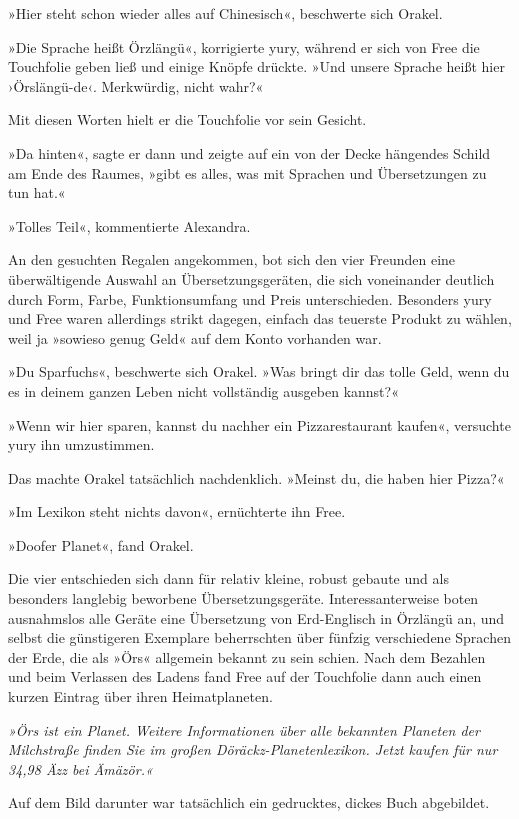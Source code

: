 »Hier steht schon wieder alles auf Chinesisch«, beschwerte sich Orakel.

»Die Sprache heißt Örzlängü«, korrigierte yury, während er sich von Free die Touchfolie geben ließ und einige Knöpfe drückte. »Und unsere Sprache heißt hier ›Örslängü-de‹. Merkwürdig, nicht wahr?«

Mit diesen Worten hielt er die Touchfolie vor sein Gesicht.

»Da hinten«, sagte er dann und zeigte auf ein von der Decke hängendes Schild am Ende des Raumes, »gibt es alles, was mit Sprachen und Übersetzungen zu tun hat.«

»Tolles Teil«, kommentierte Alexandra.

An den gesuchten Regalen angekommen, bot sich den vier Freunden eine überwältigende Auswahl an Übersetzungsgeräten, die sich voneinander deutlich durch Form, Farbe, Funktionsumfang und Preis unterschieden. Besonders yury und Free waren allerdings strikt dagegen, einfach das teuerste Produkt zu wählen, weil ja »sowieso genug Geld« auf dem Konto vorhanden war.

»Du Sparfuchs«, beschwerte sich Orakel. »Was bringt dir das tolle Geld, wenn du es in deinem ganzen Leben nicht vollständig ausgeben kannst?«

»Wenn wir hier sparen, kannst du nachher ein Pizzarestaurant kaufen«, versuchte yury ihn umzustimmen.

Das machte Orakel tatsächlich nachdenklich. »Meinst du, die haben hier Pizza?«

»Im Lexikon steht nichts davon«, ernüchterte ihn Free.

»Doofer Planet«, fand Orakel.

Die vier entschieden sich dann für relativ kleine, robust gebaute und als besonders langlebig beworbene Übersetzungsgeräte. Interessanterweise boten ausnahmslos alle Geräte eine Übersetzung von Erd-Englisch in Örzlängü an, und selbst die günstigeren Exemplare beherrschten über fünfzig verschiedene Sprachen der Erde, die als »Örs« allgemein bekannt zu sein schien. Nach dem Bezahlen und beim Verlassen des Ladens fand Free auf der Touchfolie dann auch einen kurzen Eintrag über ihren Heimatplaneten.

\textit{»Örs ist ein Planet. Weitere Informationen über alle bekannten Planeten der Milchstraße finden Sie im großen Döräckz-Planetenlexikon. Jetzt kaufen für nur 34,98 Äzz bei Ämäzör.«}

Auf dem Bild darunter war tatsächlich ein gedrucktes, dickes Buch abgebildet.

